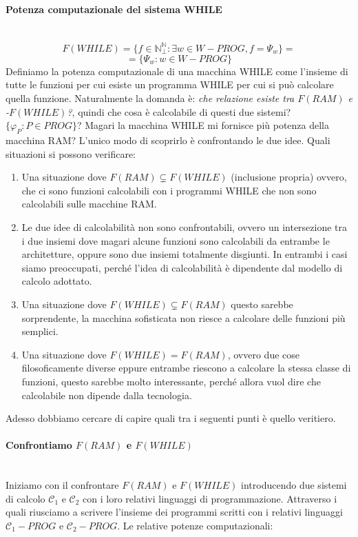 \documentclass{article}
\begin{document}
\paragraph{Potenza computazionale del sistema WHILE}\mbox{}\\
$$F(WHILE)=\{f\in\mathbb{N}_\bot^\mathbb{N} : \exists w\in W-PROG, f=\Psi_w\}=$$
$$=\{\Psi_w : w\in W-PROG\}$$
Definiamo la potenza computazionale di
una macchina WHILE come l'insieme di tutte le funzioni per cui
esiste un programma WHILE per cui si può calcolare quella funzione.
Naturalmente la domanda è: \textit{che relazione esiste tra $F(RAM)$ e -$F(WHILE)$?}, quindi
che cosa è calcolabile di questi due sistemi? $\{\varphi_P:P\in PROG\}$?
Magari la macchina WHILE mi fornisce più potenza della macchina RAM? L'unico modo di scoprirlo
è confrontando le due idee. Quali situazioni si possono verificare:
\begin{enumerate}
    \item Una situazione dove $F(RAM)\subsetneq F(WHILE)$ (inclusione propria) ovvero, che ci sono funzioni
          calcolabili con i programmi WHILE che non sono calcolabili sulle macchine RAM.

    \item Le due idee di calcolabilità non sono confrontabili, ovvero un intersezione tra i due insiemi
          dove magari alcune funzioni sono calcolabili da entrambe le architetture, oppure sono due insiemi
          totalmente disgiunti. In entrambi i casi siamo preoccupati, perché l'idea di calcolabilità è dipendente
          dal modello di calcolo adottato.

    \item Una situazione dove $F(WHILE)\subsetneq F(RAM)$ questo sarebbe sorprendente, la macchina
          sofisticata non riesce a calcolare delle funzioni più semplici.

    \item Una situazione dove $F(WHILE)=F(RAM)$, ovvero due cose filosoficamente diverse eppure entrambe
          riescono a calcolare la stessa classe di funzioni, questo sarebbe molto interessante, perché allora
          vuol dire che calcolabile non dipende dalla tecnologia.
\end{enumerate}
Adesso dobbiamo cercare di capire quali tra i seguenti punti è quello veritiero.

\paragraph{Confrontiamo $F(RAM)$ e $F(WHILE)$}\mbox{}\\
Iniziamo con il confrontare $F(RAM)$ e $F(WHILE)$ introducendo due sistemi di calcolo $\mathcal{C}_1$ e $\mathcal{C}_2$
con i loro relativi linguaggi di programmazione. Attraverso i quali riusciamo a scrivere l'insieme dei
programmi scritti con i relativi linguaggi $\mathcal{C}_1-PROG$ e $\mathcal{C}_2-PROG$. Le relative
potenze computazionali:
\end{document}
